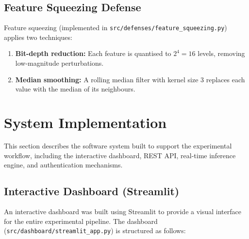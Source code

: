 \documentclass[12pt,a4paper,oneside]{report}
\begin{document}
\subsection{Feature Squeezing Defense}

Feature squeezing (implemented in \texttt{src/defenses/feature\_squeezing.py}) applies two techniques:

\begin{enumerate}
    \item \textbf{Bit-depth reduction:} Each feature is quantised to $2^4 = 16$ levels, removing low-magnitude perturbations.
    \item \textbf{Median smoothing:} A rolling median filter with kernel size 3 replaces each value with the median of its neighbours.
\end{enumerate}

\section{System Implementation}

This section describes the software system built to support the experimental workflow, including the interactive dashboard, REST API, real-time inference engine, and authentication mechanisms.

\subsection{Interactive Dashboard (Streamlit)}

An interactive dashboard was built using Streamlit to provide a visual interface for the entire experimental pipeline. The dashboard (\texttt{src/dashboard/streamlit\_app.py}) is structured as follows:
\end{document}
